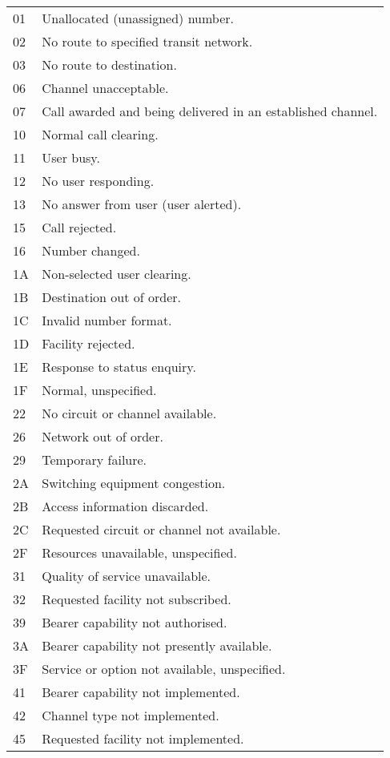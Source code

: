 \begin{description}
\begin{small}
\begin{longtable}{lp{12cm}}
  01 &   Unallocated (unassigned) number. \\
  02 &   No route to specified transit network. \\
  03 &   No route to destination. \\
  06 &   Channel unacceptable. \\
  07 &   Call awarded and being delivered in an established channel. \\
  10 &   Normal call clearing. \\
  11 &   User busy. \\
  12 &   No user responding. \\
  13 &   No answer from user (user alerted). \\
  15 &   Call rejected. \\
  16 &   Number changed. \\
  1A &   Non-selected user clearing. \\
  1B &   Destination out of order. \\
  1C &   Invalid number format. \\
  1D &   Facility rejected. \\
  1E &   Response to status enquiry. \\
  1F &   Normal, unspecified. \\
  22 &   No circuit or channel available. \\
  26 &   Network out of order. \\
  29 &   Temporary failure. \\
  2A &   Switching equipment congestion. \\
  2B &   Access information discarded. \\
  2C &   Requested circuit or channel not available. \\
  2F &   Resources unavailable, unspecified. \\
  31 &   Quality of service unavailable. \\
  32 &   Requested facility not subscribed. \\
  39 &   Bearer capability not authorised. \\
  3A &   Bearer capability not presently available. \\
  3F &   Service or option not available, unspecified. \\
  41 &   Bearer capability not implemented. \\
  42 &   Channel type not implemented. \\
  45 &   Requested facility not implemented. \\

\end{longtable}
\end{small}
\end{description}
